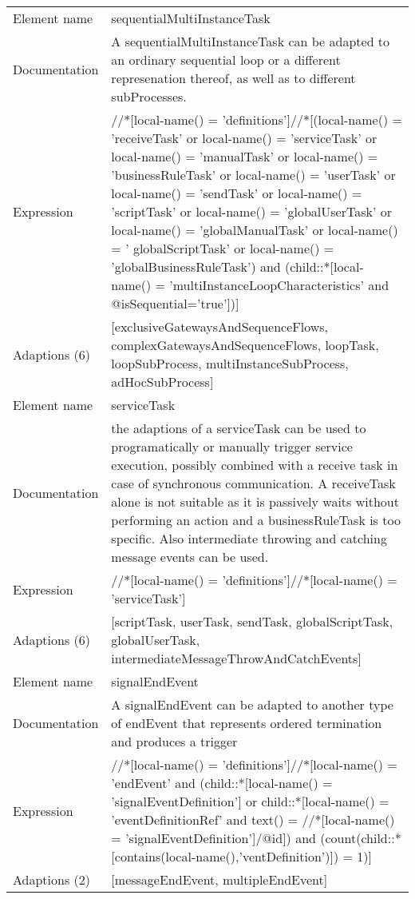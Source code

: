 \begin{center}
\begin{tiny}
\begin{longtable}{p{}|p{}}
\midrule
Element name & sequentialMultiInstanceTask\\
\myrowcolour
Documentation &A sequentialMultiInstanceTask can be adapted to an ordinary sequential loop or a different represenation thereof, as well as to different subProcesses.\\
Expression & //*[local-name() = 'definitions']//*[(local-name() = 'receiveTask' or local-name() = 'serviceTask' or local-name() = 'manualTask' or local-name() = 'businessRuleTask' or local-name() = 'userTask' or local-name() = 'sendTask' or local-name() = 'scriptTask'  or local-name() = 'globalUserTask' or local-name() = 'globalManualTask' or local-name() = ' globalScriptTask' or local-name() = 'globalBusinessRuleTask') and (child::*[local-name() = 'multiInstanceLoopCharacteristics' and @isSequential='true'])]\\
\myrowcolour
Adaptions (6) & [exclusiveGatewaysAndSequenceFlows, complexGatewaysAndSequenceFlows, loopTask, loopSubProcess, multiInstanceSubProcess, adHocSubProcess]\\
\midrule
Element name & serviceTask\\
\myrowcolour
Documentation &the adaptions of a serviceTask can be used to programatically or manually trigger service execution, possibly combined with a receive task in case of synchronous communication. A receiveTask alone is not suitable as it is passively waits without performing an action and a businessRuleTask is too specific. Also intermediate throwing and catching message events can be used.\\
Expression & //*[local-name() = 'definitions']//*[local-name() = 'serviceTask']\\
\myrowcolour
Adaptions (6) & [scriptTask, userTask, sendTask, globalScriptTask, globalUserTask, intermediateMessageThrowAndCatchEvents]\\
\midrule
Element name & signalEndEvent\\
\myrowcolour
Documentation &A signalEndEvent can be adapted to another type of endEvent that represents ordered termination and produces a trigger\\
Expression & //*[local-name() = 'definitions']//*[local-name() = 'endEvent' and (child::*[local-name() = 'signalEventDefinition'] or child::*[local-name() = 'eventDefinitionRef' and text() = //*[local-name() = 'signalEventDefinition']/@id]) and (count(child::*[contains(local-name(),'ventDefinition')]) = 1)]\\
\myrowcolour
Adaptions (2) & [messageEndEvent, multipleEndEvent]\\

\end{longtable}
\end{tiny}
\end{center}
